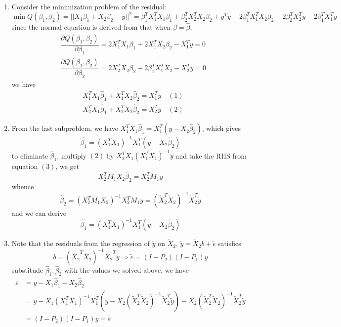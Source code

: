 \documentclass[12pt]{article}
\begin{document}
\begin{enumerate}
    \item Consider the minimization problem of the residual: 
    $$\min Q(\beta_1,\beta_2)=||X_1\beta_1+X_2\beta_2-y||^2=\beta_1^TX_1^TX_1\beta_1+\beta_2^TX_2^TX_2\beta_2+y^Ty+2\beta_1^TX_1^TX_2\beta_2-2\beta_2^TX_2^Ty-2\beta_1^TX_1^Ty$$
    since the normal equation is derived from that when $\beta=\hat\beta$, 
    \begin{align*}
        &\dfrac{\partial Q(\beta_1,\beta_2)}{\partial \beta_1}=2X_1^TX_1\beta_1+2X_1^TX_2\beta_2-X_1^Ty=0\\
        &\dfrac{\partial Q(\beta_1,\beta_2)}{\partial \beta_2}=2X_2^TX_2\beta_2+2\beta_1^TX_1^TX_2-X_2^Ty=0
    \end{align*}
    we have
    \begin{align*}
        &X_1^TX_1\hat\beta_1+X_1^TX_2\hat\beta_2=X_1^Ty\quad(1)\\
        &X_2^TX_1\hat\beta_1+X_2^TX_2\hat\beta_2=X_2^Ty\quad(2)
    \end{align*}
    \item From the last subproblem, we have $X_1^TX_1\hat\beta_1=X_1^T(y-X_2\hat\beta_2)$, which gives 
    $$\hat{\beta_1}=(X_1^TX_1)^{-1}X_1^T(y-X_2\hat\beta_2)$$
    to eliminate $\hat\beta_1$, multiply $(2)$ by $X_2^TX_1(X_1^TX_1)^{-1}y$ and take the RHS from equation $(3)$, we get
    \begin{equation}
        X_2^TM_1X_2\hat\beta_2=X_2^TM_1y
    \end{equation}
    whence 
    \begin{equation}
        \hat\beta_2=(X_2^TM_1X_2)^{-1}X_2^TM_1y=(\tilde X_2^T\tilde X_2)^{-1}\tilde X_2^T\tilde y
    \end{equation} 
    and we can derive
    \begin{equation}
        \hat\beta_1=(X_1^T X_1)^{-1}X_1^T(y-X_2\hat\beta_2)
    \end{equation}
    \item Note that the residuals from the regression of $\tilde y$ on $\tilde X_2$, $\tilde y=\tilde X_2 b+\tilde \epsilon$ satisfies
    \begin{equation}
         b=(\tilde{X_2}^T \tilde{X_2})^{-1}\tilde{X_2}^T \tilde y\Rightarrow\tilde\varepsilon=(I-P_2)(I-P_1)y
    \end{equation}
    substitude $\hat\beta_1,\hat\beta_2$ with the values we solved above, we have
    \begin{align*}
        \varepsilon&=y-X_1\hat\beta_1-X_2\hat \beta_2\\&=y-X_1(X_1^T X_1)^{-1}X_1^T(y-X_2(\tilde X_2^T\tilde X_2)^{-1}\tilde X_2^T\tilde y)-X_2(\tilde X_2^T\tilde X_2)^{-1}\tilde X_2^T\tilde y\\
        &=(I-P_2)(I-P_1)y=\tilde{\varepsilon}
    \end{align*}
\end{enumerate}
\end{document}
